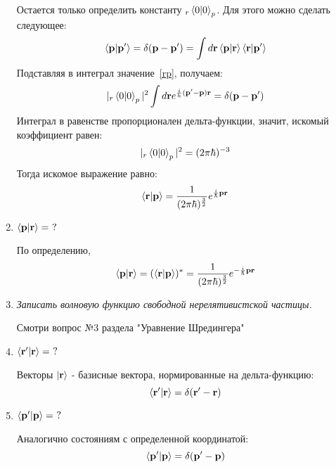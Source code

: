 \documentclass{article}
\begin{document}
\begin{enumerate}
\begin{equation}
	\end{equation}
	Остается только определить константу $_r\braket{0|0}_p$. Для этого можно сделать следующее:
	\begin{equation}
		\braket{\textbf{p}|\textbf{p}'} = \delta(\textbf{p} - \textbf{p}') = \int d\textbf{r} \braket{\textbf{p}|\textbf{r}}\braket{\textbf{r}|\textbf{p}'}
	\end{equation}
	Подставляя в интеграл значение~\eqref{rp}, получаем:
	\begin{equation}
		|_r\braket{0|0}_p|^2 \int d\textbf{r} e^{\frac{i}{h}(\textbf{p}' - \textbf{p})\textbf{r}} = \delta(\textbf{p} - \textbf{p}')
	\end{equation}
	Интеграл в равенстве пропорционален дельта-функции, значит, искомый коэффициент равен:
	\begin{equation}
		|_r\braket{0|0}_p|^2 = (2\pi\hbar)^{-3}
	\end{equation}
	Тогда искомое выражение равно:
	\begin{equation}
		\braket{\textbf{r}|\textbf{p}} = \frac{1}{(2\pi\hbar)^{\frac{3}{2}}} e^{\frac{i}{\hbar}\textbf{pr}}
	\end{equation}
	
	\item $\braket{\textbf{p}|\textbf{r}} = \ ?$
		
	По определению,
	\begin{equation}
		\braket{\textbf{p}|\textbf{r}} = (\braket{\textbf{r}|\textbf{p}})^* = \frac{1}{(2\pi\hbar)^{\frac{3}{2}}} e^{-\frac{i}{\hbar}\textbf{pr}}
	\end{equation}
	
	\item \textit{Записать волновую функцию свободной нерелятивистской частицы.}
	
	Смотри вопрос №3 раздела "Уравнение Шредингера"
	\item $\braket{\textbf{r}'|\textbf{r}} = \ ?$
	
	Векторы $\ket{\textbf{r}}$ - базисные вектора, нормированные на дельта-функцию:
	\begin{equation}
		\braket{\textbf{r}'|\textbf{r}} = \delta(\textbf{r}' - \textbf{r})
	\end{equation}
	
	\item $\braket{\textbf{p}'|\textbf{p}} = \ ?$
	
	Аналогично состояниям с определенной координатой:
	\begin{equation}
		\braket{\textbf{p}'|\textbf{p}} = \delta(\textbf{p}' - \textbf{p})	
	\end{equation}
	

\end{enumerate}
\end{document}
